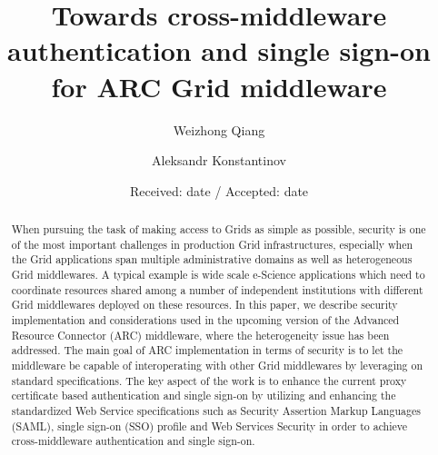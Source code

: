 \documentclass[twocolumn]{svjour3}         %
\begin{document}
\title{Towards cross-middleware authentication and single sign-on for ARC Grid middleware
}


\author{Weizhong Qiang         \and
        Aleksandr Konstantinov %
}



\date{Received: date / Accepted: date}


\maketitle

\begin{abstract}
When pursuing the task of making access to Grids as simple as possible, security is one of the most important challenges in production Grid infrastructures, especially when the Grid applications span multiple administrative domains as well as heterogeneous Grid middlewares. A typical example is wide scale e-Science applications which need to coordinate resources shared among a number of independent institutions with different Grid middlewares deployed on these resources. In this paper, we describe security implementation and considerations used in the upcoming version of the Advanced Resource Connector (ARC) middleware, where the heterogeneity issue has been addressed. The main goal of ARC implementation in terms of security is to let the middleware be capable of interoperating with other Grid middlewares by leveraging on standard specifications. The key aspect of the work is to enhance the current proxy certificate based authentication and single sign-on by utilizing and enhancing the standardized Web Service specifications such as Security Assertion Markup Languages (SAML), single sign-on (SSO) profile and Web Services Security in order to achieve cross-middleware authentication and single sign-on.
\end{abstract}
\end{document}
